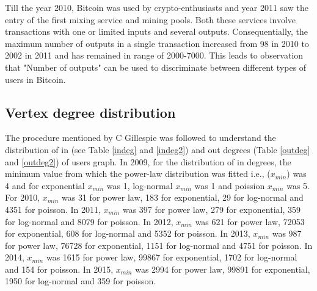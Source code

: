 \documentclass[preprint,12pt]{elsarticle}
\begin{document}
Till the year 2010, Bitcoin was used by crypto-enthusiasts and year 2011 saw the entry of the first mixing service and mining pools. Both these services involve transactions with one or limited inputs and several outputs. Consequentially, the maximum number of outputs in a single transaction increased from 98 in 2010 to 2002 in 2011 and has remained in range of 2000-7000. This leads to observation that "Number of outputs" can be used to discriminate between different types of users in Bitcoin.

\subsection{Vertex degree distribution}
The procedure mentioned by C Gillespie \cite{gillespie2014fitting} was followed to understand the distribution of in (see Table \ref{indeg} and \ref{indeg2}) and out degrees (Table \ref{outdeg} and \ref{outdeg2}) of users graph. In 2009, for the distribution of in degrees, the minimum value from which the power-law distribution was fitted i.e., ($x_{min}$) was 4 and for exponential $x_{min}$ was 1, log-normal $x_{min}$ was 1 and poission $x_{min}$ was 5. For 2010, $x_{min}$ was 31 for power law, 183 for exponential, 29 for log-normal and 4351 for poisson. In 2011, $x_{min}$ was 397 for power law, 279 for exponential, 359 for log-normal and 8079 for poisson. In 2012, $x_{min}$ was 621 for power law, 72053 for exponential, 608 for log-normal and 5352 for poisson. In 2013, $x_{min}$ was 987 for power law, 76728 for exponential, 1151 for log-normal and 4751 for poisson. In 2014, $x_{min}$ was 1615 for power law, 99867 for exponential, 1702 for log-normal and 154 for poisson. In 2015, $x_{min}$ was 2994 for power law, 99891 for exponential, 1950 for log-normal and 359 for poisson. 
\end{document}
